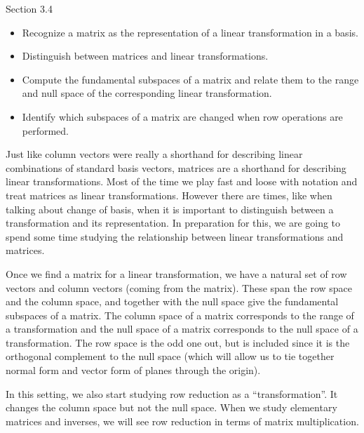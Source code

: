 \begin{lesson}

	Section 3.4

	\begin{itemize}
		\item Recognize a matrix as the representation of a linear transformation in a basis.
		\item Distinguish between matrices and linear transformations.
		\item Compute the fundamental subspaces of a matrix and relate them to the range and null space
			of the corresponding linear transformation.
		\item Identify which subspaces of a matrix are changed when row operations are performed.
	\end{itemize}

		Just like column vectors were really a shorthand for describing linear combinations
		of standard basis vectors,
		matrices are a shorthand for describing linear transformations. Most of the time we play fast
		and loose with notation and treat matrices as linear transformations. However there are times,
		like when talking about change of basis, when it is important to distinguish between
		a transformation and its representation. In preparation for this, we are going to spend some
		time studying the relationship between linear transformations and matrices.

		Once we find a matrix for a linear transformation, we have a natural set of row vectors and column
		vectors (coming from the matrix). These span the row space and the column space,
		and together with the null space give the fundamental subspaces of a matrix. The column space of
		a matrix corresponds to the range of a transformation and the null space of a matrix corresponds
		to the null space of a transformation. The row space is the odd one out, but is included since it is
		the orthogonal complement to the null space (which will allow us to tie together normal form and vector
		form of planes through the origin).

		In this setting, we also start studying row reduction as a ``transformation''. It changes
		the column space but not the null space. When we study elementary matrices and inverses, we will
		see row reduction in terms of matrix multiplication.

\end{lesson}

